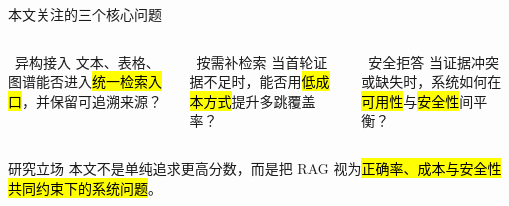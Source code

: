 \begin{frame}{本文关注的三个核心问题}
  \begin{columns}[T,onlytextwidth]
    \begin{block}{\ 异构接入}
      文本、表格、图谱能否进入\hl{统一检索入口}，并保留可追溯来源？
    \end{block}

    \begin{block}{\ 按需补检索}
      当首轮证据不足时，能否用\hl{低成本方式}提升多跳覆盖率？
    \end{block}

    \begin{block}{\ 安全拒答}
      当证据冲突或缺失时，系统如何在\hl{可用性}与\hl{安全性}间平衡？
    \end{block}
  \end{columns}

  \vspace{0.5em}
  \begin{exampleblock}{研究立场}
    本文不是单纯追求更高分数，而是把 RAG 视为\hl{正确率、成本与安全性共同约束下的系统问题}。
  \end{exampleblock}
\end{frame}
